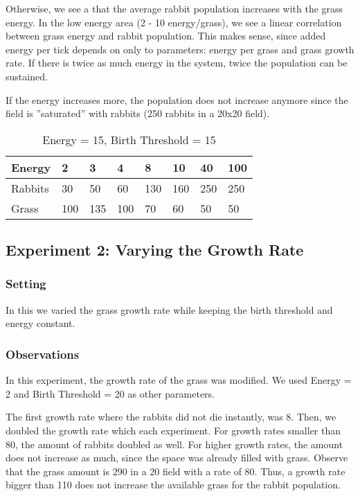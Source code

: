\documentclass[11pt]{article}
\begin{document}
Otherwise, we see a that the average rabbit population increases with the grass energy.
In the low energy area (2 - 10 energy/grass), we see a linear correlation between grass energy and rabbit population.
This makes sense, since added energy per tick depends on only to parameters: energy per grass and grass growth rate.
If there is twice as much energy in the system, twice the population can be sustained.

If the energy increases more, the population does not increase anymore since the field is ''saturated'' with rabbits (250 rabbits in a 20x20 field).
\begin{table}[]
	\centering
	\caption{Energy = 15, Birth Threshold = 15}
	\begin{tabular}{@{}llllllll@{}}
		\toprule
		Energy  & 2   & 3   & 4   & 8   & 10  & 40  & 100 \\ \midrule
		Rabbits & 30  & 50  & 60  & 130 & 160 & 250 & 250 \\
		Grass   & 100 & 135 & 100 & 70  & 60  & 50  & 50  \\ \bottomrule
	\end{tabular}
\end{table}

\subsection{Experiment 2: Varying the Growth Rate}

\subsubsection{Setting}
In this we varied the grass growth rate while keeping the birth threshold and energy constant.

\subsubsection{Observations}
In this experiment, the growth rate of the grass was modified.
We used Energy = 2 and Birth Threshold = 20 as other parameters.

The first growth rate where the rabbits did not die instantly, was 8.
Then, we doubled the growth rate which each experiment.
For growth rates smaller than 80, the amount of rabbits doubled as well.
For higher growth rates, the amount does not increase as much, since the space was already filled with grass.
Observe that the grass amount is 290 in a 20 field with a rate of 80.
Thus, a growth rate bigger than 110 does not increase the available grass for the rabbit population.
\end{document}
